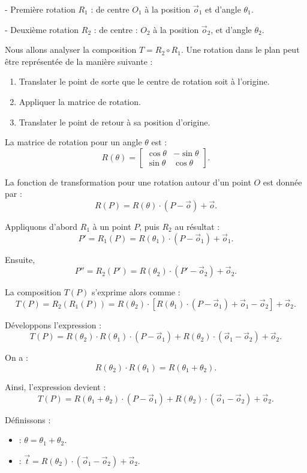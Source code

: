 - Premi{\`e}re rotation $R_1$ : de centre $O_1$ {\`a} la position $\vec{o}_1$
et d'angle $\theta_1$.

- Deuxi{\`e}me rotation $R_2$ : de centre : $O_2$ {\`a} la position
$\vec{o}_2$, et d'angle $\theta_2$.

Nous allons analyser la composition $T = R_2 \circ R_1$. Une rotation dans le
plan peut {\^e}tre repr{\'e}sent{\'e}e de la mani{\`e}re suivante :
\begin{enumerate}
  \item Translater le point de sorte que le centre de rotation soit {\`a}
  l'origine.
  
  \item Appliquer la matrice de rotation.
  
  \item Translater le point de retour {\`a} sa position d'origine.
\end{enumerate}


La matrice de rotation pour un angle $\theta$ est :
\[ R (\theta) = \left[ \begin{array}{cc}
     \cos \theta & - \sin \theta\\
     \sin \theta & \cos \theta
   \end{array} \right] . \]


La fonction de transformation pour une rotation autour d'un point $O$ est
donn{\'e}e par :
\[ R (P) = R (\theta) \cdot (P - \vec{o}) + \vec{o} . \]


Appliquons d'abord $R_1$ {\`a} un point $P$, puis $R_2$ au r{\'e}sultat :
\[ P' = R_1 (P) = R (\theta_1) \cdot (P - \vec{o}_1) + \vec{o}_1 . \]


Ensuite,
\[ P'' = R_2 (P') = R (\theta_2) \cdot (P' - \vec{o}_2) + \vec{o}_2 . \]


La composition $T (P)$ s'exprime alors comme :
\[ T (P) = R_2 (R_1 (P)) = R (\theta_2) \cdot [R (\theta_1) \cdot (P -
   \vec{o}_1) + \vec{o}_1 - \vec{o}_2] + \vec{o}_2 . \]


D{\'e}veloppons l'expression :
\[ T (P) = R (\theta_2) \cdot R (\theta_1) \cdot (P - \vec{o}_1) + R
   (\theta_2) \cdot (\vec{o}_1 - \vec{o}_2) + \vec{o}_2 . \]


On a :
\[ R (\theta_2) \cdot R (\theta_1) = R (\theta_1 + \theta_2) . \]


Ainsi, l'expression devient :
\[ T (P) = R (\theta_1 + \theta_2) \cdot (P - \vec{o}_1) + R (\theta_2) \cdot
   (\vec{o}_1 - \vec{o}_2) + \vec{o}_2 . \]


D{\'e}finissons :
\begin{itemize}
  \item {} : $\theta = \theta_1 + \theta_2$.
  
  \item {} : $\vec{t} = R (\theta_2) \cdot
  (\vec{o}_1 - \vec{o}_2) + \vec{o}_2$.
\end{itemize}


